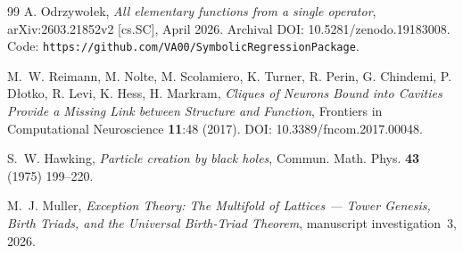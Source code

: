 \documentclass[11pt,a4paper]{article}
\theoremstyle{definition}
\theoremstyle{remark}
\begin{document}
\begin{thebibliography}{99}
A. Odrzywo{\l}ek,
\emph{All elementary functions from a single operator},
arXiv:2603.21852v2 [cs.SC], April 2026.
Archival DOI: 10.5281/zenodo.19183008.
Code: \texttt{https://github.com/VA00/SymbolicRegressionPackage}.

M.~W. Reimann, M. Nolte, M. Scolamiero, K. Turner, R. Perin, G. Chindemi, P. D{\l}otko, R. Levi, K. Hess, H. Markram,
\emph{Cliques of Neurons Bound into Cavities Provide a Missing Link between Structure and Function},
Frontiers in Computational Neuroscience {\bf 11}:48 (2017).
DOI: 10.3389/fncom.2017.00048.

S.~W. Hawking,
\emph{Particle creation by black holes},
Commun. Math. Phys. {\bf 43} (1975) 199--220.

M.~J. Muller,
\emph{Exception Theory: The Multifold of Lattices --- Tower Genesis, Birth Triads, and the Universal Birth-Triad Theorem}, manuscript investigation~3, 2026.

\end{thebibliography}
\end{document}
